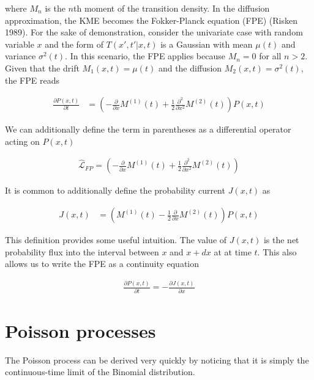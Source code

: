\documentclass{ucetd}
\begin{document}
\begin{appendices}
where $M_{n}$ is the $n$th moment of the transition density. In the diffusion approximation, the KME becomes the Fokker-Planck equation (FPE) (Risken 1989). For the sake of demonstration, consider the univariate case with random variable $x$ and the form of $T(x',t'|x,t)$ is a Gaussian with mean $\mu(t)$ and variance $\sigma^{2}(t)$. In this scenario, the FPE applies because $M_{n} = 0$ for all $n > 2$. Given that the drift $M_{1}(x,t) = \mu(t)$ and the diffusion $M_{2}(x,t) = \sigma^{2}(t)$, the FPE reads

\begin{align}
\frac{\partial P(x,t)}{\partial t}  &= \left(-\frac{\partial}{\partial x}M^{(1)}(t) + \frac{1}{2}\frac{\partial^{2}}{\partial x^{2}}M^{(2)}(t)\right)P(x,t)
\end{align}

We can additionally define the term in parentheses as a differential operator acting on $P(x,t)$

\begin{align}
\hat{\mathcal{L}}_{FP} = \left(-\frac{\partial}{\partial x}M^{(1)}(t) + \frac{1}{2}\frac{\partial^{2}}{\partial x^{2}}M^{(2)}(t)\right)
\end{align}

It is common to additionally define the probability current $J(x,t)$ as 

\begin{align}
J(x,t)  &= \left(M^{(1)}(t) - \frac{1}{2}\frac{\partial}{\partial x}M^{(2)}(t)\right)P(x,t)
\end{align}

This definition provides some useful intuition. The value of $J(x,t)$ is the net probability flux into the interval between $x$ and $x+dx$ at at time $t$. This also allows us to write the FPE as a continuity equation

\begin{align}
\frac{\partial P(x,t)}{\partial t} = -\frac{\partial J(x,t)}{\partial x}
\end{align}
\end{appendices}



\section{Poisson processes}

The Poisson process can be derived very quickly by noticing that it is simply the continuous-time limit of the Binomial distribution.
\end{document}
